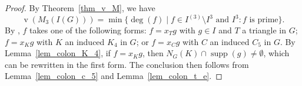 \documentclass[12pt]{amsart}
\def\v{\operatorname{v}}
\def\deg{\operatorname{deg}}
\begin{document}
\begin{proof}
By Theorem~\ref{thm_v_M}, we have 
$$\v(M_3(I(G))) = \min \{ \deg(f) \mid f \in I^{(3)} \setminus I^3 \text{ and } I^3 : f \text{ is prime} \}.$$
By \cite[Theorem 2.10]{mnptv22}, $f$ takes one of the following forms: $f = x_T g$ with $g \in I$ and $T$ a triangle in $G$; $f = x_K g$ with $K$ an induced $K_4$ in $G$; or $f = x_C g$ with $C$ an induced $C_5$ in $G$. By Lemma~\ref{lem_colon_K_4}, if $f = x_K g$, then $N_G(K) \cap \operatorname{supp}(g) \neq \emptyset$, which can be rewritten in the first form. The conclusion then follows from Lemma~\ref{lem_colon_c_5} and Lemma~\ref{lem_colon_t_e}.
\end{proof}



\end{document}
